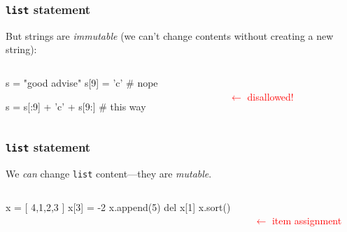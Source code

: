 \documentclass[11pt]{beamer}
\begin{document}
\begin{frame}[fragile]
  \frametitle{\texttt{list} statement}
  \Enlarge

  \begin{itemize}
  \myitem  But strings are \emph{immutable} (we can't change contents without creating a new string):
  \end{itemize}
  \begin{columns}
  \begin{column}{0.6\textwidth}
    \begin{semiverbatim}
s = "good advise"
s[9] = 'c'                 # nope

s = s[:9] + 'c' + s[9:]    # this way
    \end{semiverbatim}
  \end{column}
  \begin{column}{0.4\textwidth}
  ~ \\
  \textcolor{red}{$\leftarrow$ disallowed!}
  ~ \\
  \end{column}
  \end{columns}
\end{frame}

\begin{frame}[fragile]
  \frametitle{\texttt{list} statement}
  \Enlarge

  \begin{itemize}
  \myitem  We \emph{can} change \texttt{list} content---they are \emph{mutable}.
  \end{itemize}
  \begin{columns}
  \begin{column}{0.6\textwidth}
    \begin{semiverbatim}
    x = [ 4,1,2,3 ]
    x[3] = -2
    x.append(5)
    del x[1]
    x.sort()
    \end{semiverbatim}
  \end{column}
  \begin{column}{0.4\textwidth}
  ~ \\
  \textcolor{red}{$\leftarrow$ item assignment}
  ~ \\ ~ \\ ~ \\ ~ \\
  \end{column}
  \end{columns}
\end{frame}
\end{document}
